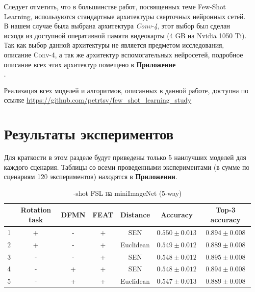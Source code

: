 \documentclass[a4paper, 12pt]{report}
\begin{document}
Следует отметить, что в большинстве работ, посвященных теме Few-Shot Learning, используются стандартные архитектуры сверточных нейронных сетей. В нашем случае была выбрана архитектура \textit{Conv-4}, этот выбор был сделан исходя из доступной оперативной памяти видеокарты (4 GB на Nvidia 1050 Ti). Так как выбор данной архитектуры не является предметом исследования, описание Conv-4, а так же архитектур вспомогательных нейросетей, подробное описание всех этих архитектур помещено в \textbf{Приложение} \\.

Реализация всех моделей и алгоритмов, описанных в данной работе, доступна по ссылке \url{https://github.com/petrtsv/few_shot_learning_study}

\chapter{Результаты экспериментов}

Для краткости в этом разделе будут приведены только 5 наилучших моделей для каждого сценария. Таблицы со всеми проведенными экспериментами (в сумме по сценариям 120 экспериментов) находятся в  \textbf{Приложении}.

\begin{table}[H]
\begin{adjustbox}{center}
\begin{tabular}{| r | c c c c | c |  c | }
\hline
    & Rotation task   & DFMN   & FEAT   & Distance         & Accuracy         & Top-3 accuracy   \\
\hline
  1 & +               & -      & +      & SEN              & $0.550 \pm 0.013$ & $0.894 \pm 0.008$ \\
\hline
  2 & +               & -      & +      & Euclidean        & $0.549 \pm 0.012$ & $0.889 \pm 0.008$ \\
\hline
  3 & -               & -      & +      & SEN              & $0.548 \pm 0.012$ & $0.895 \pm 0.008$ \\
\hline
  4 & -               & +      & +      & SEN              & $0.548 \pm 0.012$ & $0.894 \pm 0.008$ \\
\hline
  5 & -               & +      & +      & Euclidean        & $0.547 \pm 0.013$ & $0.889 \pm 0.008$ \\
\hline
\end{tabular}
\end{adjustbox}
	\caption{-shot FSL на miniImageNet (5-way)}
\end{table}
\end{document}
